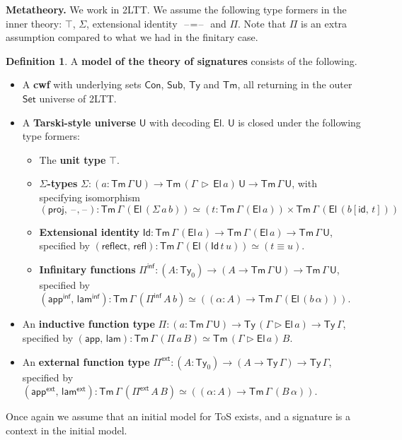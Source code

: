 \documentclass[12pt,a4paper,twoside,openany]{book}
\theoremstyle{remark}
\theoremstyle{definition}
\newtheorem{mydefinition}{Definition}
\theoremstyle{theorem}
\newcommand{\ms}[1]{\mathsf{#1}}
\newcommand{\refl}{\mathsf{refl}}
\newcommand{\reflect}{\mathsf{reflect}}
\newcommand{\id}{\mathsf{id}}
\newcommand{\Con}{\mathsf{Con}}
\newcommand{\Sub}{\mathsf{Sub}}
\newcommand{\Tm}{\mathsf{Tm}}
\newcommand{\Ty}{\mathsf{Ty}}
\newcommand{\U}{\mathsf{U}}
\newcommand{\El}{\mathsf{El}}
\newcommand{\Id}{\mathsf{Id}}
\newcommand{\proj}{\mathsf{proj}}
\newcommand{\blank}{\mathord{\hspace{1pt}\text{--}\hspace{1pt}}}
\newcommand{\Set}{\mathsf{Set}}
\newcommand{\ext}{\triangleright}
\newcommand{\Pie}{\Pi^{\mathsf{ext}}}
\newcommand{\appe}{\mathsf{app^{ext}}}
\newcommand{\lame}{\mathsf{lam^{ext}}}
\newcommand{\Piinf}{\Pi^{\mathsf{inf}}}
\newcommand{\appinf}{\mathsf{app^{inf}}}
\newcommand{\laminf}{\mathsf{lam^{inf}}}
\newcommand{\app}{\ms{app}}
\newcommand{\lam}{\ms{lam}}
\begin{document}
\textbf{Metatheory.} We work in 2LTT. We assume the following type formers in
the inner theory: $\top$, $\Sigma$, extensional identity $\blank\!=\!\blank$ and
$\Pi$. Note that $\Pi$ is an extra assumption compared to what we had in the
finitary case.

\begin{mydefinition}
\label{def:iqiit-tos}
A \textbf{model of the theory of signatures} consists of the following.
  \begin{itemize}
    \item A \textbf{cwf} with underlying sets $\Con$, $\Sub$, $\Ty$ and $\Tm$, all returning in
      the outer $\Set$ universe of 2LTT.
    \item A \textbf{Tarski-style universe} $\U$ with decoding $\El$. $\U$ is closed under the following type formers:
      \begin{itemize}
        \item The \textbf{unit type} $\top$.
        \item \textbf{$\Sigma$-types} $\Sigma : (a : \Tm\,\Gamma\,\U) \to \Tm\,(\Gamma\,\ext\,\El\,a)\,\U \to \Tm\,\Gamma\,\U$, with specifying isomorphism
          \[(\proj,\,\blank\!,\!\blank) : \Tm\,\Gamma\,(\El\,(\Sigma\,a\,b))\simeq (t : \Tm\,\Gamma\,(\El\,a)) \times \Tm\,\Gamma\,(\El\,(b[\id,\,t]))\]
        \item \textbf{Extensional identity} $\Id : \Tm\,\Gamma\,(\El\,a) \to \Tm\,\Gamma\,(\El\,a) \to \Tm\,\Gamma\,\U$,
          specified by $(\reflect,\,\refl) : \Tm\,\Gamma\,(\El\,(\Id\,t\,u)) \simeq (t \equiv u)$.
        \item \textbf{Infinitary functions} $\Piinf : (A : \Ty_0) \to (A \to \Tm\,\Gamma\,\U) \to \Tm\,\Gamma\,\U$, specified by $(\appinf,\,\laminf) : \Tm\,\Gamma\,(\Piinf\,A\,b) \simeq ((\alpha : A) \to \Tm\,\Gamma\,(\El\,(b\,\alpha)))$.
      \end{itemize}
    \item An \textbf{inductive function type} $\Pi : (a : \Tm\,\Gamma\,\U) \to
      \Ty\,(\Gamma\ext\El\,a) \to \Ty\,\Gamma$, specified by
      $(\app,\,\lam) : \Tm\,\Gamma\,(\Pi\,a\,B) \simeq \Tm\,(\Gamma \ext \El\,a)\,B$.
    \item An \textbf{external function type} $\Pie : (A : \Ty_0) \to (A \to \Ty\,\Gamma) \to \Ty\,\Gamma$, specified by
      $(\appe,\,\lame) : \Tm\,\Gamma\,(\Pie\,A\,B) \simeq ((\alpha : A) \to \Tm\,\Gamma\,(B\,\alpha))$.
  \end{itemize}
\end{mydefinition}
Once again we assume that an initial model for ToS exists, and a signature is a
context in the initial model.
\end{document}
